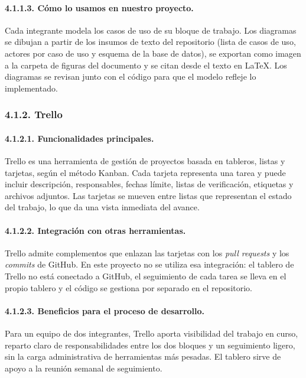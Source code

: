 \paragraph{4.1.1.3. Cómo lo usamos en nuestro proyecto.}

Cada integrante modela los casos de uso de su bloque de trabajo. Los diagramas se dibujan a partir de los insumos de texto del repositorio (lista de casos de uso, actores por caso de uso y esquema de la base de datos), se exportan como imagen a la carpeta de figuras del documento y se citan desde el texto en LaTeX. Los diagramas se revisan junto con el código para que el modelo refleje lo implementado.

\subsubsection{4.1.2. Trello}

\paragraph{4.1.2.1. Funcionalidades principales.}

Trello es una herramienta de gestión de proyectos basada en tableros, listas y tarjetas, según el método Kanban. Cada tarjeta representa una tarea y puede incluir descripción, responsables, fechas límite, listas de verificación, etiquetas y archivos adjuntos. Las tarjetas se mueven entre listas que representan el estado del trabajo, lo que da una vista inmediata del avance.

\paragraph{4.1.2.2. Integración con otras herramientas.}

Trello admite complementos que enlazan las tarjetas con los \textit{pull requests} y los \textit{commits} de GitHub. En este proyecto no se utiliza esa integración: el tablero de Trello no está conectado a GitHub, el seguimiento de cada tarea se lleva en el propio tablero y el código se gestiona por separado en el repositorio.

\paragraph{4.1.2.3. Beneficios para el proceso de desarrollo.}

Para un equipo de dos integrantes, Trello aporta visibilidad del trabajo en curso, reparto claro de responsabilidades entre los dos bloques y un seguimiento ligero, sin la carga administrativa de herramientas más pesadas. El tablero sirve de apoyo a la reunión semanal de seguimiento.

